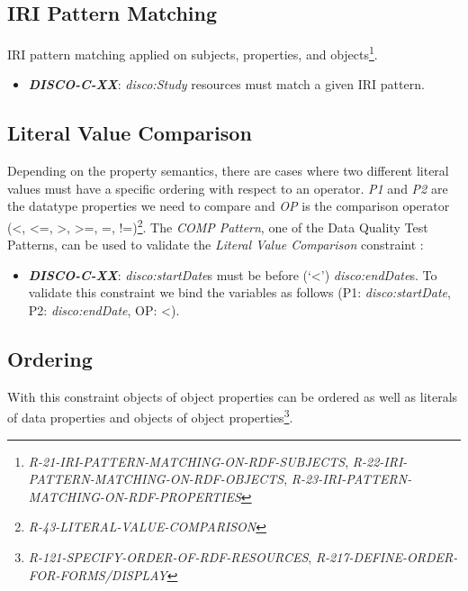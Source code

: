 \documentclass{llncs}
\begin{document}
\subsection{IRI Pattern Matching}

IRI pattern matching applied on subjects, properties, and objects\footnote{\emph{R-21-IRI-PATTERN-MATCHING-ON-RDF-SUBJECTS}, \emph{R-22-IRI-PATTERN-MATCHING-ON-RDF-OBJECTS}, \emph{R-23-IRI-PATTERN-MATCHING-ON-RDF-PROPERTIES}}.

\begin{itemize}
	\item \textbf{{\em DISCO-C-XX}}: \emph{disco:Study} resources must match a given IRI pattern.
\end{itemize}

\subsection{Literal Value Comparison}

Depending on the property semantics,
there are cases where two different literal values must have
a specific ordering with respect to an operator. 
\emph{P1} and \emph{P2} are the datatype properties we need to compare and 
\emph{OP} is the comparison operator (\textless, \textless=, \textgreater, \textgreater=, =, !=)\footnote{{\em R-43-LITERAL-VALUE-COMPARISON}}.
The {\em COMP Pattern}, one of the Data Quality Test Patterns, can be used to validate the {\em Literal Value Comparison} constraint \cite{Kontokostas2014}:


\begin{itemize}
	\item \textbf{{\em DISCO-C-XX}}:
{\em disco:startDate}s must be before (‘\textless’) {\em disco:endDate}s.
To validate this constraint we bind the variables as follows (P1: {\em disco:startDate}, P2: {\em disco:endDate}, OP: \textless). 
\end{itemize}

\subsection{Ordering}

With this constraint objects of object properties can be ordered as well as literals of data properties and objects of object properties\footnote{\emph{R-121-SPECIFY-ORDER-OF-RDF-RESOURCES}, \emph{R-217-DEFINE-ORDER-FOR-FORMS/DISPLAY}}.
\end{document}
